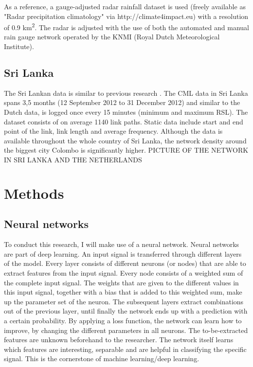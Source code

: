 \documentclass[twocolumn, 10pt, a4paper]{article}
\begin{document}
	As a reference, a gauge-adjusted radar rainfall dataset is used (freely available as "Radar precipitation climatology" via http://climate4impact.eu) with a resolution of 0.9 km\textsuperscript{2}. The radar is adjusted with the use of both the automated and  manual rain gauge network operated by the KNMI (Royal Dutch Meteorological Institute).
	
	
	\subsection{Sri Lanka}
	The Sri Lankan data is similar to previous research \cite{Overeem2021}.
	The CML data in Sri Lanka spans 3,5 months (12 September 2012 to 31 December 2012) and similar to the Dutch data, is logged once every 15 minutes (minimum and maximum RSL). The dataset consists of on average 1140 link paths. Static data include start and end point of the link, link length and average frequency. Although the data is available throughout the whole country of Sri Lanka, the network density around the biggest city Colombo is significantly higher. PICTURE OF THE NETWORK IN SRI LANKA AND THE NETHERLANDS
	
	
	
	\section{Methods}
	\subsection{Neural networks}
	To conduct this research, I will make use of a neural network. Neural networks are part of deep learning. An input signal is transferred through different layers of the model. Every layer consists of different neurons (or nodes) that are able to extract features from the input signal. Every node consists of a weighted sum of the complete input signal. The weights that are given to the different values in this input signal, together with a bias that is added to this weighted sum, make up the parameter set of the neuron. 
	The subsequent layers extract combinations out of the previous layer, until finally the network ends up with a prediction with a certain probability. By applying a loss function, the network can learn how to improve, by changing the different parameters in all neurons. The to-be-extracted features are unknown beforehand to the researcher. The network itself learns which features are interesting, separable and are helpful in classifying the specific signal. This is the cornerstone of machine learning/deep learning. 
	
\end{document}
